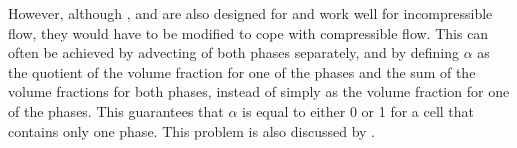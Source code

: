 
However, although \CICSAM, \STACS and \MULES are also designed for and work well for incompressible flow, they would have to be modified to cope with compressible flow. This can often be achieved by advecting  of both phases separately, and by defining $\alpha$ as the quotient of the volume fraction for one of the phases and the sum of the volume fractions for both phases, instead of simply as the volume fraction for one of the phases. This guarantees that $\alpha$ is equal to either 0 or 1 for a cell that contains only one phase. This problem is also discussed by \citet{Heyns2011}.









